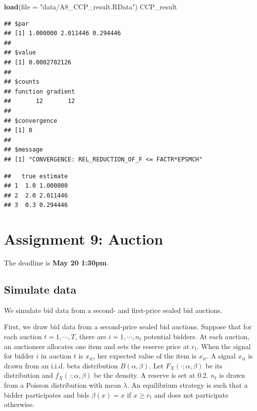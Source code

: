 \documentclass[]{book}
\newenvironment{Shaded}{\begin{snugshade}}{\end{snugshade}}
\newcommand{\KeywordTok}[1]{\textcolor[rgb]{0.13,0.29,0.53}{\textbf{#1}}}
\newcommand{\DataTypeTok}[1]{\textcolor[rgb]{0.13,0.29,0.53}{#1}}
\newcommand{\DecValTok}[1]{\textcolor[rgb]{0.00,0.00,0.81}{#1}}
\newcommand{\StringTok}[1]{\textcolor[rgb]{0.31,0.60,0.02}{#1}}
\newcommand{\OperatorTok}[1]{\textcolor[rgb]{0.81,0.36,0.00}{\textbf{#1}}}
\newcommand{\NormalTok}[1]{#1}
\begin{document}
\begin{Shaded}
\begin{Highlighting}[]
\KeywordTok{load}\NormalTok{(}\DataTypeTok{file =} \StringTok{"data/A8_CCP_result.RData"}\NormalTok{)}
\NormalTok{CCP_result}
\end{Highlighting}
\end{Shaded}

\begin{verbatim}
## $par
## [1] 1.000000 2.011446 0.294446
## 
## $value
## [1] 0.0002702126
## 
## $counts
## function gradient 
##       12       12 
## 
## $convergence
## [1] 0
## 
## $message
## [1] "CONVERGENCE: REL_REDUCTION_OF_F <= FACTR*EPSMCH"
\end{verbatim}

\begin{Shaded}
\end{Shaded}

\begin{verbatim}
##   true estimate
## 1  1.0 1.000000
## 2  2.0 2.011446
## 3  0.3 0.294446
\end{verbatim}

\chapter{Assignment 9: Auction}\label{assignment-9-auction}

The deadline is \textbf{May 20 1:30pm}.

\section{Simulate data}\label{simulate-data-8}

We simulate bid data from a second- and first-price sealed bid auctions.

First, we draw bid data from a second-price sealed bid auctions. Suppose
that for each auction \(t = 1, \cdots, T\), there are
\(i = 1, \cdots, n_t\) potential bidders. At each auction, an auctioneer
allocates one item and sets the reserve price at \(r_t\). When the
signal for bidder \(i\) in auction \(t\) is \(x_{it}\), her expected
value of the item is \(x_{it}\). A signal \(x_{it}\) is drawn from an
i.i.d. beta distribution \(B(\alpha, \beta)\). Let
\(F_X(\cdot; \alpha, \beta)\) be its distribution and
\(f_X(\cdot; \alpha, \beta)\) be the density. A reserve is set at 0.2.
\(n_t\) is drawn from a Poisson distribution with mean \(\lambda\). An
equilibrium strategy is such that a bidder participates and bids
\(\beta(x) = x\) if \(x \ge r_t\) and does not participate otherwise.
\end{document}
